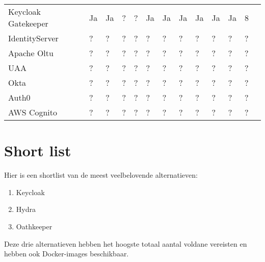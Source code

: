 \begin{table}[htbp]
\begin{adjustbox}{width=1\textwidth}
\begin{tabular}{@{}lllllllllllll@{}}
    Keycloak Gatekeeper & Ja       & Ja        & ?                   & ?               & Ja               & Ja             & Ja         & Ja         & Ja             & Ja          & 8      \\
    IdentityServer & ?             & ?         & ?                   & ?               & ?                & ?              & ?          & ?          & ?              & ?           & ?      \\
    Apache Oltu   & ?             & ?         & ?                   & ?               & ?                & ?              & ?          & ?          & ?              & ?           & ?      \\
    UAA           & ?             & ?         & ?                   & ?               & ?                & ?              & ?          & ?          & ?              & ?           & ?      \\
    Okta          & ?             & ?         & ?                   & ?               & ?                & ?              & ?          & ?          & ?              & ?           & ?      \\
    Auth0         & ?             & ?         & ?                   & ?               & ?                & ?              & ?          & ?          & ?              & ?           & ?      \\
    AWS Cognito   & ?             & ?         & ?                   & ?               & ?                & ?              & ?          & ?          & ?              & ?           & ?      \\
    \bottomrule
  \end{tabular}
  \end{adjustbox}
\end{table}


\section{Short list}%
\label{sec:short-list}
Hier is een shortlist van de meest veelbelovende alternatieven:
\begin{enumerate}
    \item Keycloak
    \item Hydra
    \item Oathkeeper
\end{enumerate}

Deze drie alternatieven hebben het hoogste totaal aantal voldane vereisten en hebben ook Docker-images beschikbaar.

